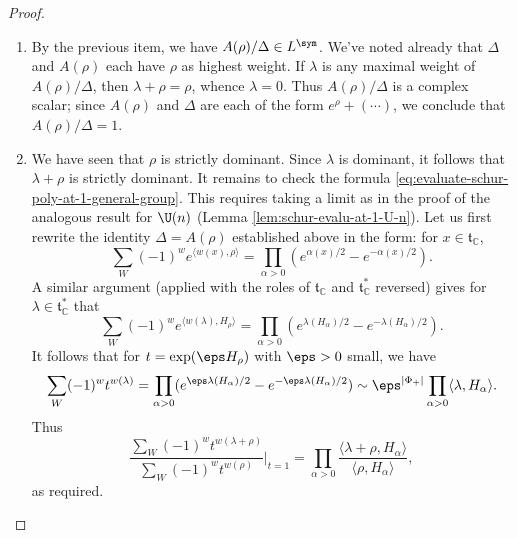 \documentclass[reqno]{amsart} 
\begin{document}
\begin{proof}
\begin{enumerate}
  \item By the previous item, we have $A(\rho)/\Delta \in L^{\sym}$.  We've noted already that $\Delta$ and $A(\rho)$ each have $\rho$ as highest weight.  If $\lambda$ is any maximal weight of $A(\rho)/\Delta$, then $\lambda + \rho = \rho$, whence $\lambda = 0$.  Thus $A(\rho)/\Delta$ is a complex scalar; since $A(\rho)$ and $\Delta$ are each of the form $e^{\rho} + (\dotsb)$, we conclude that $A(\rho)/\Delta = 1$.
  \item We have seen that $\rho$ is strictly dominant.  Since $\lambda$ is dominant, it follows that $\lambda + \rho$ is strictly dominant.  It remains to check the formula \eqref{eq:evaluate-schur-poly-at-1-general-group}.  This requires taking a limit as in the proof of the analogous result for $\U(n)$ (Lemma \ref{lem:schur-evalu-at-1-U-n}).  Let us first rewrite the identity $\Delta = A(\rho)$ established above in the form: for $x \in \mathfrak{t}_{\mathbb{C}}$,
    \begin{equation}
      \sum_{W}
      (-1)^w
      e^{\langle w(x), \rho \rangle}
      =
      \prod_{\alpha > 0}
      (
      e^{\alpha(x)/2} - e^{-\alpha(x)/2}
      ).
    \end{equation}
    A similar argument (applied with the roles of $\mathfrak{t}_{\mathbb{C}}$ and $\mathfrak{t}_{\mathbb{C}}^*$ reversed) gives for $\lambda \in \mathfrak{t}_{\mathbb{C}}^*$ that
    \begin{equation}
      \sum_{W}
      (-1)^w
      e^{\langle w(\lambda),  H_\rho \rangle}
      =
      \prod_{\alpha > 0}
      (
      e^{\lambda(H_\alpha)/2} - e^{-\lambda(H_\alpha)/2}
      ).
    \end{equation}
    It follows that for $t = \exp(\eps H_\rho)$ with $\eps > 0$ small, we have
    \begin{equation*}
      \sum_{W} (-1)^w t^{w(\lambda)} = \prod_{\alpha > 0} ( e^{\eps \lambda(H_\alpha)/2} - e^{-\eps \lambda(H_\alpha)/2} ) \sim \eps^{|\Phi_+|} \prod_{\alpha > 0} \langle \lambda, H_\alpha \rangle.
    \end{equation*}
    Thus
    \begin{equation*}
      \frac{ \sum_{W} (-1)^w t^{w(\lambda + \rho )} } { \sum_{W} (-1)^w t^{w(\rho )} } |_{t=1} = \prod_{\alpha > 0} \frac{ \langle \lambda + \rho , H_\alpha \rangle }{ \langle \rho, H_\alpha \rangle },
    \end{equation*}
    as required.
  \end{enumerate}
\end{proof}
\end{document}
